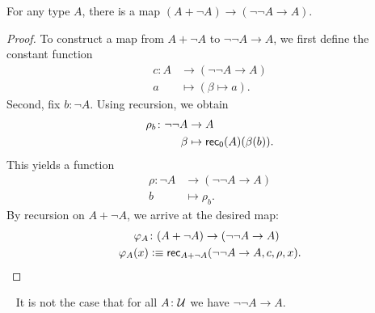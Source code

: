 \begin{lem}\label{lem:A+negA-to-negnegA-to-A}
    For any type\/ $A$, there is a map\/ $(A+\neg A)\to(\neg\neg A\to A)$.
\end{lem}

\begin{proof}
    To construct a map from $A+\neg A$ to $\neg\neg A\to A$, we first define the constant function
    \begin{align*}
        c\colon A&\to(\neg\neg A\to A)\\
        a&\mapsto(\beta\mapsto a).
    \end{align*}
    Second, fix $b\colon\neg A$. Using recursion, we obtain
    \begin{align*}
        \rho_b\colon\neg\neg A&\to A\\
        \beta&\mapsto\fun{rec}_{\fun0}(A)(\beta(b)).
    \end{align*}
    This yields a function
    \begin{align*}
        \rho\colon\neg A&\to(\neg\neg A\to A)\\
        b&\mapsto\rho_b.
    \end{align*}
    By recursion on $A+\neg A$, we arrive at the desired map:
    \begin{align*}
        \varphi_A&\colon(A+\neg A)\to(\neg\neg A\to A)\\
        \varphi_A(x)&\defeq\fun{rec}_{A+\neg A}(\neg\neg A\to A,c,\rho,x).
    \end{align*}
\end{proof}


\begin{thm}\fe\ \ua
    It is not the case that for all\/ $A\colon\univ$ we have\/ $\neg\neg A\to A$.
\end{thm}

